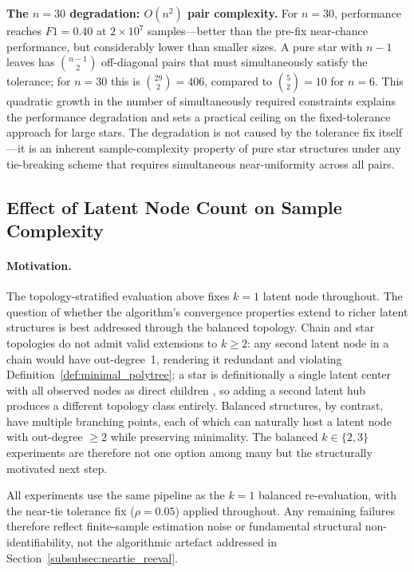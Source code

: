 \documentclass[11pt,a4paper]{article}
\numberwithin{equation}{section}
\begin{document}
\textbf{The $n=30$ degradation: $O(n^2)$ pair complexity.}  For $n=30$, performance
reaches $F1 = 0.40$ at $2 \times 10^7$ samples---better than the pre-fix near-chance
performance, but considerably lower than smaller sizes.  A pure star with $n-1$ leaves
has $\binom{n-1}{2}$ off-diagonal pairs that must simultaneously satisfy the tolerance;
for $n=30$ this is $\binom{29}{2} = 406$, compared to $\binom{5}{2} = 10$ for $n=6$.
This quadratic growth in the number of simultaneously required constraints explains the
performance degradation and sets a practical ceiling on the fixed-tolerance approach
for large stars.  The degradation is not caused by the tolerance fix itself---it is an
inherent sample-complexity property of pure star structures under any tie-breaking
scheme that requires simultaneous near-uniformity across all pairs.

\subsection{Effect of Latent Node Count on Sample Complexity}
\label{subsec:multi_latent}

\paragraph{Motivation.}
The topology-stratified evaluation above fixes $k=1$ latent node throughout.  The
question of whether the algorithm's convergence properties extend to richer latent
structures is best addressed through the balanced topology.  Chain and star topologies
do not admit valid extensions to $k \geq 2$: any second latent node in a chain would
have out-degree~1, rendering it redundant and violating Definition~\ref{def:minimal_polytree};
a star is definitionally a single latent center with all observed nodes as direct
children \citep{etesami:kiyavash:coleman:2016}, so adding a second latent hub produces
a different topology class entirely.  Balanced structures, by contrast, have multiple
branching points, each of which can naturally host a latent node with out-degree $\geq 2$
while preserving minimality.  The balanced $k \in \{2,3\}$ experiments are therefore
not one option among many but the structurally motivated next step.

All experiments use the same pipeline as the $k=1$ balanced re-evaluation, with the
near-tie tolerance fix ($\rho = 0.05$) applied throughout.  Any remaining failures
therefore reflect finite-sample estimation noise or fundamental structural
non-identifiability, not the algorithmic artefact addressed in
Section~\ref{subsubsec:neartie_reeval}.
\end{document}
